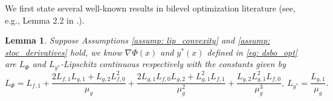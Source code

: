 \documentclass{article}
\theoremstyle{plain}
\newtheorem{lemma}[theorem]{Lemma}
\theoremstyle{definition}
\theoremstyle{remark}
\begin{document}
We first state several well-known results in bilevel optimization literature (see, e.g., Lemma 2.2 in \citet{ghadimi2018approximation}.).
\begin{lemma}\label{lem: smoothness}
    Suppose Assumptions \ref{assump: lip_convexity} and \ref{assump: stoc_derivatives} hold, we know $\nabla\Phi(x)$ and $y^*(x)$ defined in \eqref{eq: dsbo_opt} are $L_{\Phi}$ and $L_{y^*}$-Lipschitz continuous respectively with the constants given by
    \begin{equation}\label{eq: smoothness_const}
        L_{\Phi} = L_{f,1} + \frac{2L_{f,1}L_{g,1} + L_{g,2}L_{f,0}^2 }{\mu_g} + \frac{2L_{g,1}L_{f,0}L_{g,2}+L_{g,1}^2L_{f,1}}{\mu_g^2} + \frac{L_{g,2}L_{g,1}^2L_{f,0}}{\mu_g^3},\ L_{y^*} = \frac{L_{g,1}}{\mu_g}.
    \end{equation}
\end{lemma}
\end{document}
